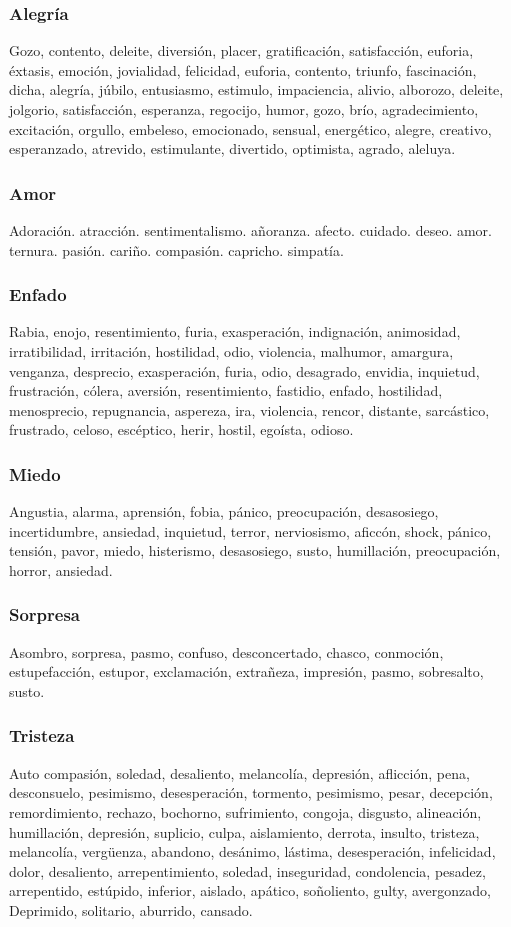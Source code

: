 \documentclass[../all.tex]{subfiles}
\begin{document}
    \subsubsection{Alegría}
    Gozo, contento, deleite, diversión, placer, gratificación, satisfacción, euforia, éxtasis, emoción, jovialidad, felicidad, euforia, contento, triunfo, fascinación, dicha, alegría, júbilo, entusiasmo, estimulo, impaciencia, alivio, alborozo, deleite, jolgorio, satisfacción, esperanza, regocijo, humor, gozo, brío, agradecimiento, excitación, orgullo, embeleso, emocionado, sensual, energético, alegre, creativo, esperanzado, atrevido, estimulante, divertido, optimista, agrado, aleluya.
    \subsubsection{Amor}
    Adoración. atracción. sentimentalismo. añoranza. afecto. cuidado. deseo. amor. ternura. pasión. cariño. compasión. capricho. simpatía.
    \subsubsection{Enfado}
    Rabia, enojo, resentimiento, furia, exasperación, indignación, animosidad, irratibilidad, irritación, hostilidad, odio, violencia, malhumor, amargura, venganza, desprecio, exasperación, furia, odio, desagrado, envidia, inquietud, frustración, cólera, aversión, resentimiento, fastidio, enfado, hostilidad, menosprecio, repugnancia, aspereza, ira, violencia, rencor, distante, sarcástico, frustrado, celoso, escéptico, herir, hostil, egoísta, odioso.
    \subsubsection{Miedo}
    Angustia, alarma, aprensión, fobia, pánico, preocupación, desasosiego, incertidumbre, ansiedad, inquietud, terror, nerviosismo, aficcón, shock, pánico, tensión, pavor, miedo, histerismo, desasosiego, susto, humillación, preocupación, horror, ansiedad.
    \subsubsection{Sorpresa}
    Asombro, sorpresa, pasmo, confuso, desconcertado, chasco, conmoción, estupefacción, estupor, exclamación, extrañeza, impresión, pasmo, sobresalto, susto.
    \subsubsection{Tristeza}
    Auto compasión, soledad, desaliento, melancolía, depresión, aflicción, pena, desconsuelo, pesimismo, desesperación, tormento, pesimismo, pesar, decepción, remordimiento, rechazo, bochorno, sufrimiento, congoja, disgusto, alineación, humillación, depresión, suplicio, culpa, aislamiento, derrota, insulto, tristeza, melancolía, vergüenza, abandono, desánimo, lástima, desesperación, infelicidad, dolor, desaliento, arrepentimiento, soledad, inseguridad, condolencia, pesadez, arrepentido, estúpido, inferior, aislado, apático, soñoliento, gulty, avergonzado, Deprimido, solitario, aburrido, cansado.
\end{document}
